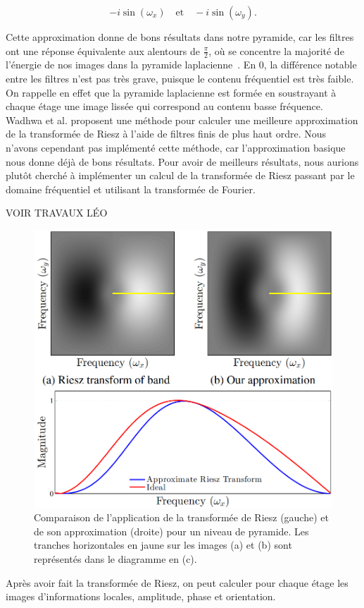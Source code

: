 \begin{equation}
    -i\sin(\omega_x) \quad \text{et} \quad -i\sin(\omega_y).
\end{equation}

Cette approximation donne de bons résultats dans notre pyramide, car les filtres ont une réponse équivalente aux alentours de $\frac\pi2$, où se concentre la majorité de l'énergie de nos images dans la pyramide laplacienne~\cite{wadhwa_riesz_2014}. En $0$, la différence notable entre les filtres n'est pas très grave, puisque le contenu fréquentiel est très faible. On rappelle en effet que la pyramide laplacienne est formée en soustrayant à chaque étage une image lissée qui correspond au contenu basse fréquence. Wadhwa et al. proposent une méthode pour calculer une meilleure approximation de la transformée de Riesz à l'aide de filtres finis de plus haut ordre. Nous n'avons cependant pas implémenté cette méthode, car l'approximation basique nous donne déjà de bons résultats. Pour avoir de meilleurs résultats, nous aurions plutôt cherché à implémenter un calcul de la transformée de Riesz passant par le domaine fréquentiel et utilisant la transformée de Fourier.

{\color{red}VOIR TRAVAUX LÉO}


\begin{figure}
    \centering
    \includegraphics[width=.5\textwidth]{contenu/resources/images/riesz_approximation}
    \caption[Approximation de la transformée de Riesz]{Comparaison de l'application de la transformée de Riesz (gauche) et de son approximation (droite) pour un niveau de pyramide. Les tranches horizontales en jaune sur les images (a) et (b) sont représentés dans le diagramme en (c).}
    \label{fig:riesz-approximation}
\end{figure}

Après avoir fait la transformée de Riesz, on peut calculer pour chaque étage les images d'informations locales, amplitude, phase et orientation.


